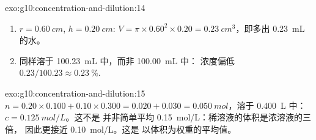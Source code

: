 \begin{solution}{exo:g10:concentration-and-dilution:14}
\begin{enumerate}
  \item $r = \qty{0.60}{cm}$, $h = \qty{0.20}{cm}$:
        $V = \pi \times 0.60^2 \times 0.20 = \qty{0.23}{cm^3}$，即多出
        \qty{0.23}{mL} 的水。
  \item {}同样溶于 \qty{100.23}{mL} 中，而非 \qty{100.00}{mL} 中：
        浓度偏低 $0.23 / 100.23 \approx
        \qty{0.23}{\percent}$.
\end{enumerate}
\end{solution}

\begin{solution}{exo:g10:concentration-and-dilution:15}
$n = 0.20 \times 0.100 + 0.10 \times 0.300 = 0.020 + 0.030 =
\qty{0.050}{mol}$，溶于 \qty{0.400}{L} 中：$c = \qty{0.125}{mol/L}$。这不是
并非简单平均 \qty{0.15}{mol/L}：稀溶液的体积是浓溶液的三倍，
因此更接近 \qty{0.10}{mol/L}。这是
以体积为权重的平均值。
\end{solution}

